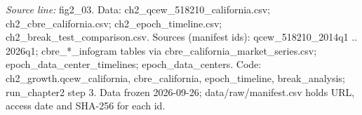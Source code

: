 {\scriptsize\textit{Source line:} fig2\_\allowbreak{}03. Data: ch2\_\allowbreak{}qcew\_\allowbreak{}518210\_\allowbreak{}california.csv; ch2\_\allowbreak{}cbre\_\allowbreak{}california.csv; ch2\_\allowbreak{}epoch\_\allowbreak{}timeline.csv; ch2\_\allowbreak{}break\_\allowbreak{}test\_\allowbreak{}comparison.csv. Sources (manifest ids): qcew\_\allowbreak{}518210\_\allowbreak{}2014q1 .. 2026q1; cbre\_\allowbreak{}*\_\allowbreak{}infogram tables via cbre\_\allowbreak{}california\_\allowbreak{}market\_\allowbreak{}series.csv; epoch\_\allowbreak{}data\_\allowbreak{}center\_\allowbreak{}timelines; epoch\_\allowbreak{}data\_\allowbreak{}centers. Code: ch2\_\allowbreak{}growth.qcew\_\allowbreak{}california, cbre\_\allowbreak{}california, epoch\_\allowbreak{}timeline, break\_\allowbreak{}analysis; run\_\allowbreak{}chapter2 step 3. Data frozen 2026-09-26; data/raw/manifest.csv holds URL, access date and SHA-256 for each id.}